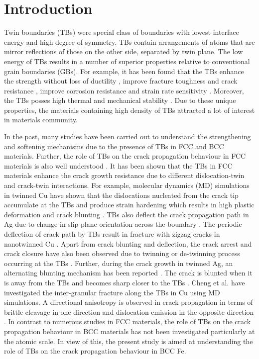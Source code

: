 \documentclass[smallextended]{svjour3}       %
\begin{document}
\section{Introduction}
\label{intro}
Twin boundaries (TBs) were special class of boundaries with lowest interface energy and high degree of symmetry. TBs 
contain arrangements of atoms that are mirror reflections of those on the other side, separated by twin plane. The low 
energy of TBs results in a number of superior properties relative to conventional grain boundaries (GBs). For example, 
it has been found that the TBs enhance the strength without loss of ductility \cite{lu2009revealing,li2010dislocation}, 
improve fracture toughness and crack resistance \cite{qin2009enhanced,singh2011fracture,liu2014atomistic}, improve 
corrosion resistance and strain rate sensitivity \cite{deng2010effects}. Moreover, the TBs posses high thermal and 
mechanical stability \cite{anderoglu2008thermal,wang2013structure}. Due to these unique properties, the materials 
containing high density of TBs attracted a lot of interest in materials community.

In the past, many studies have been carried out to understand the strengthening and softening mechanisms due to the 
presence of TBs in FCC \cite{lu2009revealing,li2010dislocation} and BCC \cite{sainath2016deformation,xu2017size,xu2018deformation} 
materials. Further, the role of TBs on the crack propagation behaviour in FCC materials is also well understood 
\cite{liu2014atomistic,zhu2011modeling}. It has been shown that the TBs in FCC materials enhance the crack growth 
resistance due to different dislocation-twin and crack-twin interactions. For example, molecular dynamics (MD) 
simulations in twinned Cu have shown that the dislocations nucleated from the crack tip accumulate at the TBs and 
produce strain hardening which results in high plastic deformation and crack blunting \cite{zhu2011modeling}. TBs 
also deflect the crack propagation path in Ag due to change in slip plane orientation across the boundary \cite{liu2014atomistic}. 
The periodic deflection of crack path by TBs result in fracture with zigzag cracks in nanotwinned Cu \cite{zeng2015fracture}. 
Apart from crack blunting and deflection, the crack arrest and crack closure have also been observed due to twinning or 
de-twinning process occurring at the TBs \cite{liu2014atomistic,zhou2015atomistic,kim2012situ}. Further, during the 
crack growth in twinned Ag, an alternating blunting mechanism has been reported \cite{liu2014atomistic}. The crack 
is blunted when it is away from the TBs and becomes sharp closer to the TBs \cite{liu2014atomistic}. Cheng et al. 
\cite{cheng2010intrinsic} have investigated the inter-granular fracture along the TBs in Cu using MD simulations. 
A directional anisotropy is observed in crack propagation in terms of brittle cleavage in one direction and dislocation 
emission in the opposite direction \cite{cheng2010intrinsic}. In contrast to numerous studies in FCC materials, the role 
of TBs on the crack propagation behaviour in BCC materials has not been investigated particularly at the atomic scale. 
In view of this, the present study is aimed at understanding the role of TBs on the crack propagation behaviour in BCC Fe. 
\end{document}
